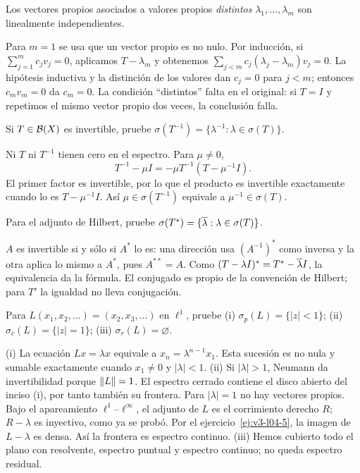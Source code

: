 \begin{ejercicio}\label{ej:v3-l07-4}
Los vectores propios asociados a valores propios \emph{distintos} $\lambda_1,\ldots,\lambda_m$ son linealmente independientes.
\end{ejercicio}
\begin{solucion}
Para $m=1$ se usa que un vector propio es no nulo. Por inducción, si $\sum_{j=1}^mc_jv_j=0$, aplicamos $T-\lambda_m$ y obtenemos $\sum_{j<m}c_j(\lambda_j-\lambda_m)v_j=0$. La hipótesis inductiva y la distinción de los valores dan $c_j=0$ para $j<m$; entonces $c_mv_m=0$ da $c_m=0$. La condición ``distintos'' falta en el original: si $T=I$ y repetimos el mismo vector propio dos veces, la conclusión falla.
\end{solucion}

\begin{ejercicio}\label{ej:v3-l07-5}
Si $T\in\mathcal B(X)$ es invertible, pruebe $\sigma(T^{-1})=\{\lambda^{-1}:\lambda\in\sigma(T)\}$.
\end{ejercicio}
\begin{solucion}
Ni $T$ ni $T^{-1}$ tienen cero en el espectro. Para $\mu\ne0$,
\[T^{-1}-\mu I=-\mu T^{-1}(T-\mu^{-1}I).
\]
El primer factor es invertible, por lo que el producto es invertible exactamente cuando lo es $T-\mu^{-1}I$. Así $\mu\in\sigma(T^{-1})$ equivale a $\mu^{-1}\in\sigma(T)$.
\end{solucion}

\begin{ejercicio}\label{ej:v3-l07-6}
Para el adjunto de Hilbert, pruebe $\sigma(T^*)=\{\overline{\lambda}:\lambda\in\sigma(T)\}$.
\end{ejercicio}
\begin{solucion}
$A$ es invertible si y sólo si $A^*$ lo es: una dirección usa $(A^{-1})^*$ como inversa y la otra aplica lo mismo a $A^*$, pues $A^{**}=A$. Como $(T-\lambda I)^*=T^*-\overline{\lambda} I$, la equivalencia da la fórmula. El conjugado es propio de la convención de Hilbert; para $T'$ la igualdad no lleva conjugación.
\end{solucion}

\begin{ejercicio}\label{ej:v3-l07-7}
Para $L(x_1,x_2,\ldots)=(x_2,x_3,\ldots)$ en $\ell^1$, pruebe (i) $\sigma_p(L)=\{|z|<1\}$; (ii) $\sigma_c(L)=\{|z|=1\}$; (iii) $\sigma_r(L)=\varnothing$.
\end{ejercicio}
\begin{solucion}
(i) La ecuación $Lx=\lambda x$ equivale a $x_n=\lambda^{n-1}x_1$. Esta sucesión es no nula y sumable exactamente cuando $x_1\ne0$ y $|\lambda|<1$. (ii) Si $|\lambda|>1$, Neumann da invertibilidad porque $\left\lVert L\right\rVert=1$. El espectro cerrado contiene el disco abierto del inciso (i), por tanto también su frontera. Para $|\lambda|=1$ no hay vectores propios. Bajo el apareamiento $\ell^1$--$\ell^\infty$, el adjunto de $L$ es el corrimiento derecho $R$; $R-\lambda$ es inyectivo, como ya se probó. Por el ejercicio~\ref{ej:v3-l04-5}, la imagen de $L-\lambda$ es densa. Así la frontera es espectro continuo. (iii) Hemos cubierto todo el plano con resolvente, espectro puntual y espectro continuo; no queda espectro residual.
\end{solucion}

